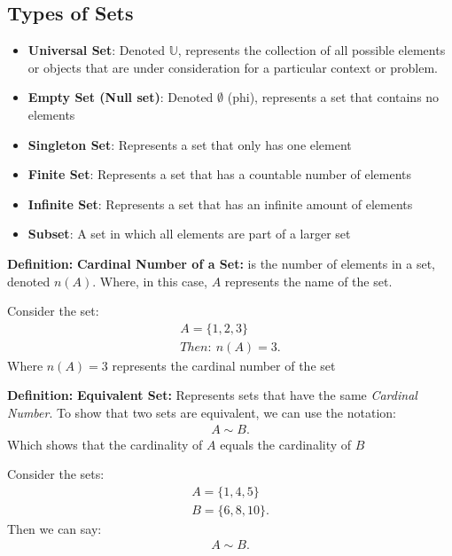 \documentclass{report}
\begin{document}
    \subsection{Types of Sets}
    \bigbreak \noindent 
    \begin{itemize}
        \item \textbf{Universal Set}: Denoted $\mathbb{U}$, represents the collection of all possible elements or objects that are under consideration for a particular context or problem.
        \item \textbf{Empty Set (Null set)}: Denoted $\emptyset$ (phi), represents a set that contains no elements
        \item \textbf{Singleton Set}: Represents a set that only has one element
        \item \textbf{Finite Set}: Represents a set that has a countable number of elements
        \item \textbf{Infinite Set}: Represents a set that has an infinite amount of elements
        \item \textbf{Subset}: A set in which all elements are part of a larger set 
    \end{itemize}
    \bigbreak \noindent 
    \begin{mdframed}
        \textbf{Definition:} \textbf{Cardinal Number of a Set:} is the number of elements in a set, denoted $n(A)$. Where, in this case, $A$ represents the name of the set.
    \end{mdframed}
    \bigbreak \noindent 
    Consider the set:
    \begin{align*}
        A = \{1,2,3\} \\
        Then:\ n(A) = 3
    .\end{align*}
    \bigbreak \noindent 
    Where $n(A) = 3$ represents the cardinal number of the set
    \bigbreak \noindent 
    \begin{mdframed}
        \textbf{Definition:} \textbf{Equivalent Set:} Represents sets that have the same \textit{Cardinal Number}. To show that two sets are equivalent, we can use the notation:
        \begin{align*}
            A \sim B 
        .\end{align*}
        \bigbreak \noindent 
        Which shows that the cardinality of $A$ equals the cardinality of $B $ 
    \end{mdframed}
    \bigbreak \noindent 
    Consider the sets:
    \begin{align*}
        A = \{1,4,5\} \\
        B = \{6,8,10\}
    .\end{align*}
    \bigbreak \noindent 
    Then we can say:
    \begin{align*}
        A \sim B 
    .\end{align*}
    



    
\end{document}
